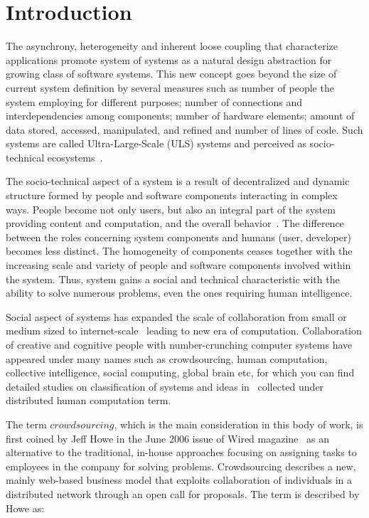 \chapter{Introduction} 


The asynchrony, heterogeneity and inherent loose coupling that characterize applications 
promote system of systems as a natural design abstraction for growing class of software 
systems. This new concept goes beyond the size of current system definition by several 
measures such as 
number of people the system employing for different purposes; 
number of connections and interdependencies among components; 
number of hardware elements; 
amount of data stored, accessed, manipulated, and refined 
and number of lines of code. Such systems are called 
Ultra-Large-Scale (ULS) systems and perceived as socio-technical 
ecosystems~\cite{ULSReport}.

The socio-technical aspect of a system is a result of decentralized and dynamic 
structure formed by people and software components interacting in complex ways. 
People become not only users, but also an integral part of the system providing 
content and computation, and the overall behavior~\cite{ULSReport}. 
The difference between the roles concerning system components and 
humans (user, developer) becomes less distinct. The homogeneity 
of components ceases together with the increasing scale and variety of people 
and software components involved within the system. Thus, system gains a social 
and technical characteristic with the ability to solve numerous problems, 
even the ones requiring human intelligence.

Social aspect of systems has expanded the scale of collaboration from small or 
medium sized to internet-scale~\cite{Dorn2012b} leading to new era of computation. 
Collaboration of creative and cognitive people with number-crunching 
computer systems have appeared under many names such as crowdsourcing, 
human computation, collective intelligence, social computing, global brain etc, 
for which you can find detailed studies on classification of systems and ideas 
in~\cite{Quinn2009, Quinn2011} collected under distributed human computation term.

The term $crowdsourcing$, which is the main consideration in this body of work, 
is first coined by Jeff Howe in the June 2006 issue of Wired magazine~\cite{Howe2006b} 
as an alternative to the traditional, in-house approaches focusing on assigning tasks 
to employees in the company for solving problems. Crowdsourcing describes a new, 
mainly web-based business model that exploits collaboration of individuals in a 
distributed network through an open call for proposals. The term is described by Howe as:

